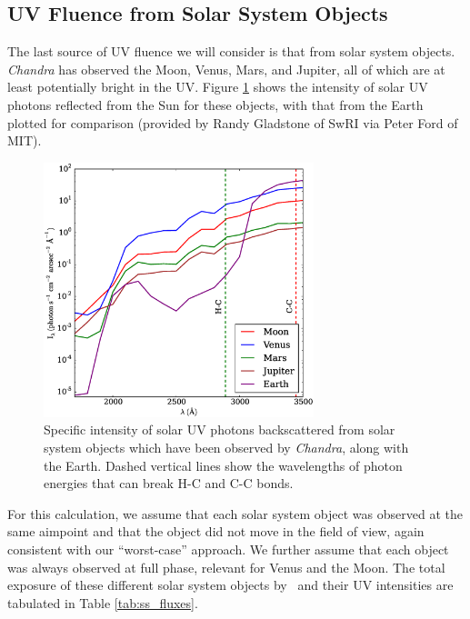 \documentclass[11pt]{article}
\begin{document}
\subsection{UV Fluence from Solar System Objects}\label{sec:ssobj}

The last source of UV fluence we will consider is that from solar system objects. {\it Chandra} has observed the
Moon, Venus, Mars, and Jupiter, all of which are at least potentially bright in the UV. Figure \ref{fig:ss_obj_intensity}
shows the intensity of solar UV photons reflected from the Sun for these objects, with that from the Earth plotted for
comparison (provided by Randy Gladstone of SwRI via Peter Ford of MIT).

\begin{figure}
\begin{center}
\includegraphics[width=0.7\textwidth]{ss_obj_intensity.eps}
\caption{Specific intensity of solar UV photons backscattered from solar system objects which have been observed by
{\it Chandra}, along with the Earth. Dashed vertical lines show the wavelengths of photon energies that can break
H-C and C-C bonds.\label{fig:ss_obj_intensity}}
\end{center}
\end{figure}

For this calculation, we assume that each solar system object was observed at the same aimpoint and that the object
did not move in the field of view, again consistent with our ``worst-case'' approach. We further assume that each
object was always observed at full phase, relevant for Venus and the Moon. The total exposure of these different
solar system objects by \chandra~and their UV intensities are tabulated in Table \ref{tab:ss_fluxes}.
\end{document}
